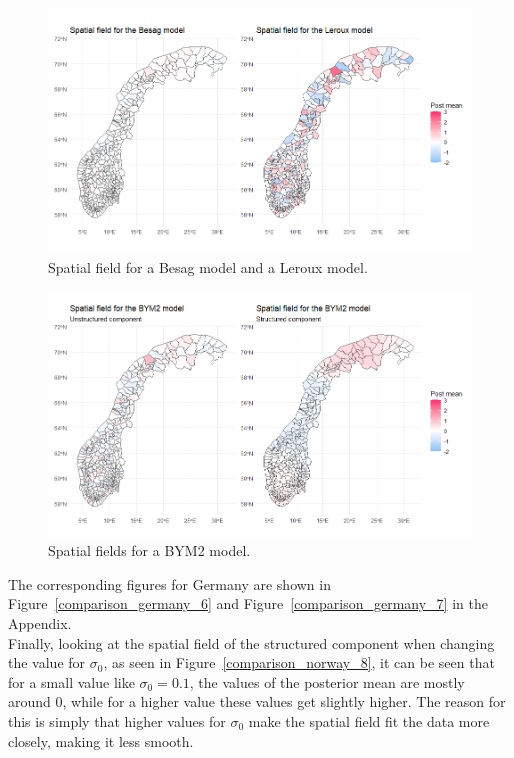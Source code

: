 \begin{figure}[H]
  \centering
  \includegraphics[width = \textwidth]{spatial_field_norway_1.png}
  \caption{Spatial field for a Besag model and a Leroux model.}
  \label{comparison_norway_6}
\end{figure}
\begin{figure}[H]
  \centering
  \includegraphics[width = \textwidth]{spatial_field_norway_2.png}
  \caption{Spatial fields for a BYM2 model.}
  \label{comparison_norway_7}
\end{figure}
The corresponding figures for Germany are shown in Figure~\ref{comparison_germany_6} and Figure~\ref{comparison_germany_7} in the Appendix. \\
Finally, looking at the spatial field of the structured component when changing the value for $\sigma_0$, as seen in Figure~\ref{comparison_norway_8}, it can be seen that for a small value like $\sigma_0 = 0.1$, the values of the posterior mean are mostly around 0, while for a higher value these values get slightly higher. The reason for this is simply that higher values for $\sigma_0$ make the spatial field fit the data more closely, making it less smooth.

